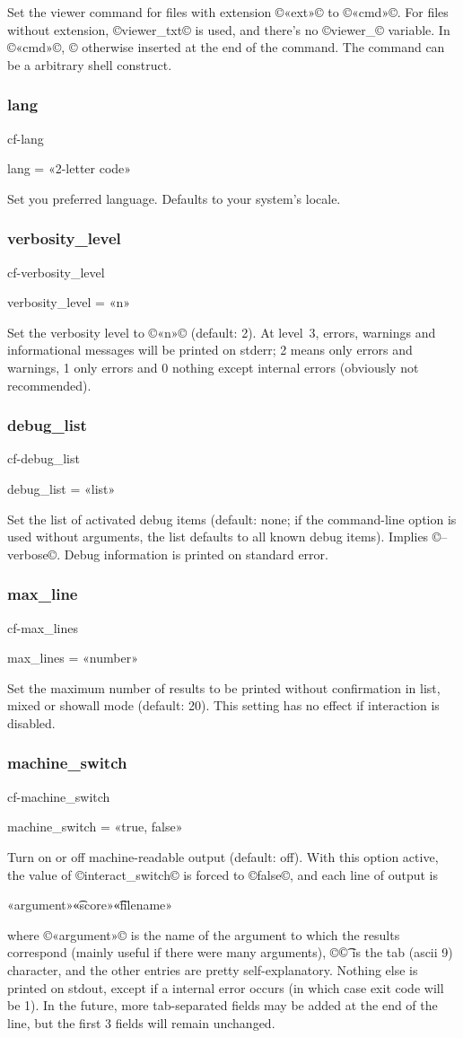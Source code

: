 \documentclass[a4paper, oneside]{scrartcl}
\makeatletter
\newif\ifframed
\newenvironment{cmdsubsub}[2]{%
  \framedfalse \commandes\subsubsection{#1}{#2}%
  }{%
  \endcommandes}
\newenvironment{htcode}{%
  \SaveVerbatim[samepage, gobble=2]{verbmat}%
  }{%
  \endSaveVerbatim
  \par\medskip\noindent\hspace*{\parindent}%
  \BUseVerbatim{verbmat}%
  \par\medskip\@endpetrue}
\makeatother
\begin{document}
Set the viewer command for files with extension ©«ext»© to ©«cmd»©. For files
without extension, ©viewer_txt© is used, and there's no ©viewer_© variable.
In ©«cmd»©, ©%
otherwise inserted at the end of the command.  The command can be a arbitrary
shell construct.

\begin{cmdsubsub}{lang}{cf-lang}
  lang = «2-letter code»
\end{cmdsubsub}

Set you preferred language. Defaults to your system's locale.

\begin{cmdsubsub}{verbosity_level}{cf-verbosity_level}
  verbosity_level = «n»
\end{cmdsubsub}

Set the verbosity level to ©«n»© (default: 2). At level~3, errors, warnings and
informational messages will be printed on stderr; 2 means only errors and
warnings, 1 only errors and 0 nothing except internal errors (obviously not
recommended).

\begin{cmdsubsub}{debug_list}{cf-debug_list}
  debug_list = «list»
\end{cmdsubsub}

Set the list of activated debug items (default: none; if the command-line
option is used without arguments, the list defaults to all known debug items).
Implies ©--verbose©. Debug information is printed on standard error.

\begin{cmdsubsub}{max_line}{cf-max_lines}
  max_lines = «number»
\end{cmdsubsub}

Set the maximum number of results to be printed without confirmation in list,
mixed or showall mode (default: 20). This setting has no effect if interaction
is disabled.

\begin{cmdsubsub}{machine_switch}{cf-machine_switch}
  machine_switch = «true, false»
\end{cmdsubsub}

Turn on or off machine-readable output (default: off).  With this option
active, the value of ©interact_switch© is forced to ©false©, and each line of
output is
\begin{htcode}
  «argument»\t«score»\t«filename»
\end{htcode}
where ©«argument»© is the name of the argument to which the results correspond
(mainly useful if there were many arguments), ©\t© is the tab (ascii 9)
character, and the other entries are pretty self-explanatory. Nothing else is
printed on stdout, except if a internal error occurs (in which case exit code
will be 1). In the future, more tab-separated fields may be added at the end
of the line, but the first 3 fields will remain unchanged.
\end{document}
